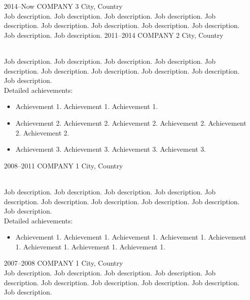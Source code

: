 \documentclass{article}
\begin{document}
\begin{entrylist}
\entry
  {2014--Now}
  {COMPANY 3}
  {City, Country}
  {\\
  Job description. Job description. Job description. Job description. Job description. Job description. Job description. Job description. Job description. Job description. Job description.}
\entry
  {2011--2014}
  {COMPANY 2}
  {City, Country}
  {\\
  Job description. Job description. Job description. Job description. Job description. Job description. Job description. Job description. Job description. Job description.\\
  Detailed achievements:
  \begin{itemize}
    \item Achievement 1. Achievement 1. Achievement 1. 
    \item Achievement 2. Achievement 2. Achievement 2. Achievement 2. Achievement 2. Achievement 2.
    \item Achievement 3. Achievement 3. Achievement 3. Achievement 3.  
  \end{itemize}}
\entry
  {2008--2011}
  {COMPANY 1}
  {City, Country}
  {\\
  Job description. Job description. Job description. Job description. Job description. Job description. Job description. Job description. Job description. Job description.\\
  Detailed achievements:
  \begin{itemize}
    \item Achievement 1. Achievement 1. Achievement 1. Achievement 1. Achievement 1. Achievement 1. Achievement 1. Achievement 1. 
  \end{itemize}}
\entry
  {2007--2008}
  {COMPANY 1}
  {City, Country}
  {\\
  Job description. Job description. Job description. Job description. Job description. Job description. Job description. Job description. Job description. Job description.\\}

\end{entrylist}

\end{document}
